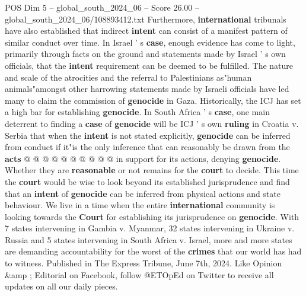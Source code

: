 \begin{textsample}{POS Dim 5 – global\_south\_2024\_06 – Score 26.00 – global\_south\_2024\_06/108893412.txt}
Furthermore, \textbf{international} tribunals have also established that indirect \textbf{intent} can consist of a manifest pattern of similar conduct over time.
In Israel ' s \textbf{case}, enough evidence has come to light, primarily through facts on the ground and statements made by Israel ' s own officials, that the \textbf{intent} requirement can be deemed to be fulfilled.
The nature and scale of the atrocities and the referral to Palestinians as"human animals"amongst other harrowing statements made by Israeli officials have led many to claim the commission of \textbf{genocide} in Gaza.
Historically, the ICJ has set a high bar for establishing \textbf{genocide}.
In South Africa ' s \textbf{case}, one main deterrent to finding a \textbf{case} of \textbf{genocide} will be ICJ ' s own \textbf{ruling} in Croatia v.
Serbia that when the \textbf{intent} is not stated explicitly, \textbf{genocide} can be inferred from conduct if it"is the only inference that can reasonably be drawn from the \textbf{acts} @ @ @ @ @ @ @ @ @ @ in support for its actions, denying \textbf{genocide}.
Whether they are \textbf{reasonable} or not remains for the \textbf{court} to decide.
This time the \textbf{court} would be wise to look beyond its established jurisprudence and find that an \textbf{intent} of \textbf{genocide} can be inferred from physical actions and state behaviour.
We live in a time when the entire \textbf{international} community is looking towards the \textbf{Court} for establishing its jurisprudence on \textbf{genocide}.
With 7 states intervening in Gambia v.
Myanmar, 32 states intervening in Ukraine v.
Russia and 5 states intervening in South Africa v.
Israel, more and more states are demanding accountability for the worst of the \textbf{crimes} that our world has had to witness.
Published in The Express Tribune, June 7th, 2024.
Like Opinion \&amp ; Editorial on Facebook, follow @ETOpEd on Twitter to receive all updates on all our daily pieces.

\end{textsample}

